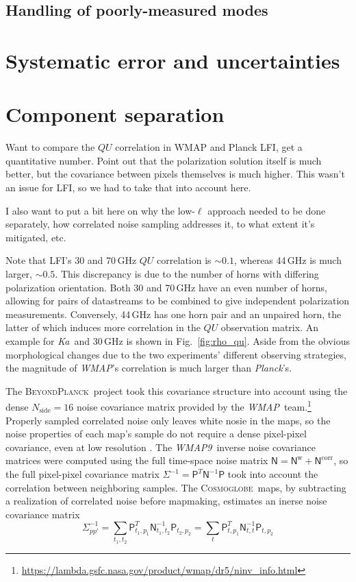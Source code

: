 \documentclass[twocolumn]{../../common/aa}
\def\WMAP{\emph{WMAP}}
\def\WMAPnine{\emph{WMAP9}}
\def\Planck{\emph{Planck}}
\newcommand{\BP}{\textsc{BeyondPlanck}}
\newcommand{\cosmoglobe}{\textsc{Cosmoglobe}}
\newcommand{\Ka}[0]{\textit{Ka}}
\begin{document}
\subsection{Handling of poorly-measured modes}


\section{Systematic error and uncertainties}
\label{sec:systematics}

\section{Component separation}

Want to compare the $QU$ correlation in WMAP and Planck LFI, get a quantitative number. Point out that the polarization solution itself is much better, but the covariance between pixels themselves is much higher. This wasn't an issue for LFI, so we had to take that into account here.

I also want to put a bit here on why the low-$\ell$ approach needed to be done separately, how correlated noise sampling addresses it, to what extent it's mitigated, etc.

Note that LFI's 30 and 70\,GHz $QU$ correlation is $\sim0.1$, whereas 44\,GHz is much larger, $\sim0.5$. This discrepancy is due to the number of horns with differing polarization orientation. Both 30 and 70\,GHz have an even number of horns, allowing for pairs of datastreams to be combined to give independent polarization measurements. Conversely, 44\,GHz has one horn pair and an unpaired horn, the latter of which induces more correlation in the $QU$ observation matrix. An example for \Ka\ and 30\,GHz is shown in Fig.~\ref{fig:rho_qu}. Aside from the obvious morphological changes due to the two experiments' different observing strategies, the magnitude of \WMAP's correlation is much larger than \Planck's.

The \BP\ project took this covariance structure into account using the dense $N_\mathrm{side}=16$ noise covariance matrix provided by the \WMAP\ team.\footnote{\url{https://lambda.gsfc.nasa.gov/product/wmap/dr5/ninv_info.html}} Properly sampled correlated noise only leaves white nosie in the maps, so the noise properties of each map's sample do not require a dense pixel-pixel covariance, even at low resolution \citep{bp01, bp10}. 
The \WMAPnine\ inverse noise covariance matrices were computed using the full time-space noise matrix $\mathsf N=\mathsf N^\mathrm w+\mathsf N^\mathrm{corr}$, so the full pixel-pixel covariance matrix $\Sigma^{-1}=\mathsf P^T\mathsf N^{-1}\mathsf P$ took into account the correlation between neighboring samples. The \cosmoglobe\ maps, by subtracting a realization of correlated noise before mapmaking, estimates an inerse noise covariance matrix
\begin{equation}
	\Sigma^{-1}_{pp'}
	=\sum_{t_1,t_2}\mathsf P_{t_1,p_1}^T\mathsf N_{t_1,t_2}^{-1}\mathsf P_{t_2,p_2}
	=\sum_t\mathsf P_{t,p_1}^T\mathsf N_{t,t}^{-1}\mathsf P_{t,p_2}
\end{equation}
\end{document}

